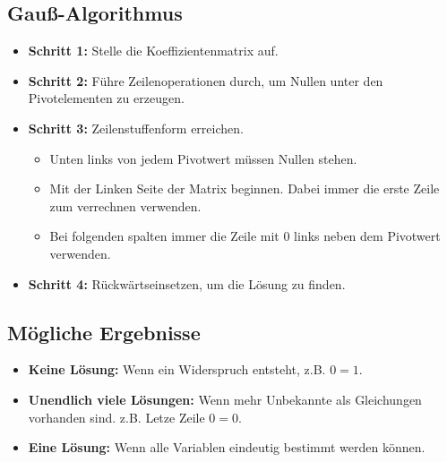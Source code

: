 \documentclass[12pt,a4paper]{article}
\begin{document}
\subsection{Gauß-Algorithmus}
\begin{itemize}
    \item \textbf{Schritt 1:} Stelle die Koeffizientenmatrix auf.
    \item \textbf{Schritt 2:} Führe Zeilenoperationen durch, um Nullen unter den Pivotelementen zu erzeugen.
    \item \textbf{Schritt 3:} Zeilenstuffenform erreichen.
    \begin{itemize}
        \item Unten links von jedem Pivotwert müssen Nullen stehen.
        \item Mit der Linken Seite der Matrix beginnen. Dabei immer die erste Zeile zum verrechnen verwenden.
        \item Bei folgenden spalten immer die Zeile mit 0 links neben dem Pivotwert verwenden.
    \end{itemize}
    \item \textbf{Schritt 4:} Rückwärtseinsetzen, um die Lösung zu finden.
\end{itemize}
\subsection{Mögliche Ergebnisse}
\begin{itemize}
    \item \textbf{Keine Lösung:} Wenn ein Widerspruch entsteht, z.B. $0 = 1$.
    \item \textbf{Unendlich viele Lösungen:} Wenn mehr Unbekannte als Gleichungen vorhanden sind. z.B. Letze Zeile $0 = 0$.
    \item \textbf{Eine Lösung:} Wenn alle Variablen eindeutig bestimmt werden können.
\end{itemize}
\end{document}
